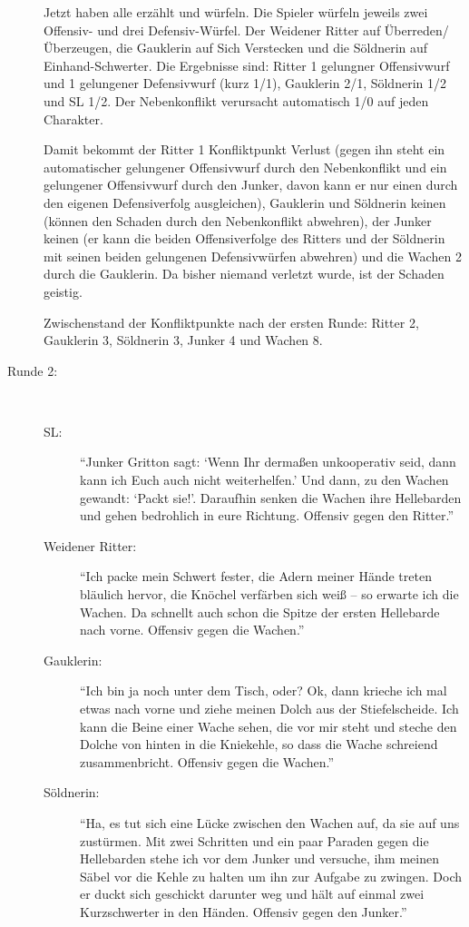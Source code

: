 \begin{description}
Jetzt haben alle erzählt und würfeln. Die Spieler würfeln jeweils zwei Offensiv- und drei Defensiv-Würfel. Der Weidener Ritter auf Überreden/Überzeugen, die Gauklerin auf Sich Verstecken und die Söldnerin auf Einhand-Schwerter. Die Ergebnisse sind: Ritter 1 gelungner Offensivwurf und 1 gelungener Defensivwurf (kurz 1/1), Gauklerin 2/1, Söldnerin 1/2 und SL 1/2. Der Nebenkonflikt verursacht automatisch 1/0 auf jeden Charakter.

Damit bekommt der Ritter 1 Konfliktpunkt Verlust (gegen ihn steht ein automatischer gelungener Offensivwurf durch den Nebenkonflikt und ein gelungener Offensivwurf durch den Junker, davon kann er nur einen durch den eigenen Defensiverfolg ausgleichen), Gauklerin und Söldnerin keinen (können den Schaden durch den Nebenkonflikt abwehren), der Junker keinen (er kann die beiden Offensiverfolge des Ritters und der Söldnerin mit seinen beiden gelungenen Defensivwürfen abwehren) und die Wachen 2 durch die Gauklerin. Da bisher niemand verletzt wurde, ist der Schaden geistig.

Zwischenstand der Konfliktpunkte nach der ersten Runde: Ritter 2, Gauklerin 3, Söldnerin 3, Junker 4 und Wachen 8.

\item[Runde 2:]~
\begin{description}
  \item[SL:] ``Junker Gritton sagt: `Wenn Ihr dermaßen unkooperativ seid, dann kann ich Euch auch nicht weiterhelfen.' Und dann, zu den Wachen gewandt: `Packt sie!'. Daraufhin senken die Wachen ihre Hellebarden und gehen bedrohlich in eure Richtung. Offensiv gegen den Ritter.''
  \item[Weidener Ritter:] ``Ich packe mein Schwert fester, die Adern meiner Hände treten bläulich hervor, die Knöchel verfärben sich weiß -- so erwarte ich die Wachen. Da schnellt auch schon die Spitze der ersten Hellebarde nach vorne. Offensiv gegen die Wachen.'' 
  \item[Gauklerin:] ``Ich bin ja noch unter dem Tisch, oder? Ok, dann krieche ich mal etwas nach vorne und ziehe meinen Dolch aus der Stiefelscheide. Ich kann die Beine einer Wache sehen, die vor mir steht und steche den Dolche von hinten in die Kniekehle, so dass die Wache schreiend zusammenbricht. Offensiv gegen die Wachen.''
  \item[Söldnerin:] ``Ha, es tut sich eine Lücke zwischen den Wachen auf, da sie auf uns zustürmen. Mit zwei Schritten und ein paar Paraden gegen die Hellebarden stehe ich vor dem Junker und versuche, ihm meinen Säbel vor die Kehle zu halten um ihn zur Aufgabe zu zwingen. Doch er duckt sich geschickt darunter weg und hält auf einmal zwei Kurzschwerter in den Händen. Offensiv gegen den Junker.''
\end{description}


\end{description}
